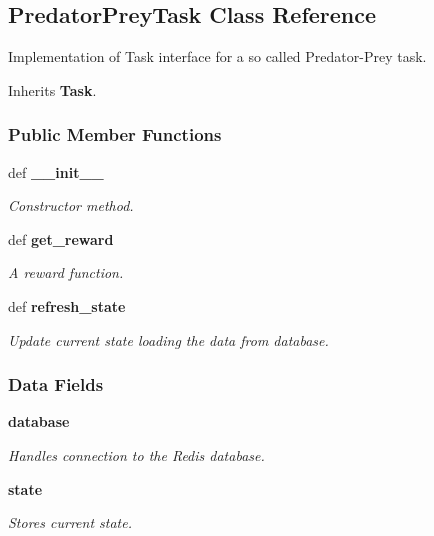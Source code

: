 \subsection{Predator\+Prey\+Task Class Reference}
\label{class_predator_prey_task_1_1_predator_prey_task}


Implementation of Task interface for a so called Predator-\/\+Prey task.  




Inherits {\bf Task}.

\subsubsection*{Public Member Functions}
\begin{DoxyCompactItemize}
\item 
def {\bf \+\_\+\+\_\+init\+\_\+\+\_\+}\label{class_predator_prey_task_1_1_predator_prey_task_ac775ee34451fdfa742b318538164070e}

\begin{DoxyCompactList}\small\item\em Constructor method. \end{DoxyCompactList}\item 
def {\bf get\+\_\+reward}
\begin{DoxyCompactList}\small\item\em A reward function. \end{DoxyCompactList}\item 
def {\bf refresh\+\_\+state}
\begin{DoxyCompactList}\small\item\em Update current state loading the data from database. \end{DoxyCompactList}\end{DoxyCompactItemize}
\subsubsection*{Data Fields}
\begin{DoxyCompactItemize}
\item 
{\bf database}\label{class_predator_prey_task_1_1_predator_prey_task_a64dbaa3229ec575b68ec333442e10cee}

\begin{DoxyCompactList}\small\item\em Handles connection to the Redis database. \end{DoxyCompactList}\item 
{\bf state}\label{class_predator_prey_task_1_1_predator_prey_task_adc6e5733fc3c22f0a7b2914188c49c90}

\begin{DoxyCompactList}\small\item\em Stores current state. \end{DoxyCompactList}\end{DoxyCompactItemize}


